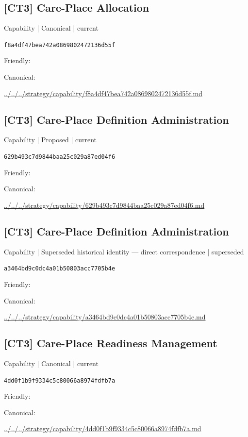 \documentclass[10pt,a4paper]{article}
\begin{document}
\subsection*{[CT3] Care-Place Allocation}
{\small Capability | Canonical | current}\par
\texttt{f8a4df47bea742a0869802472136d55f}\par
Friendly: \par
Canonical: \par
{\footnotesize\url{../../../strategy/capability/f8a4df47bea742a0869802472136d55f.md}}\par
\subsection*{[CT3] Care-Place Definition Administration}
{\small Capability | Proposed | current}\par
\texttt{629b493c7d9844baa25c029a87ed04f6}\par
Friendly: \par
Canonical: \par
{\footnotesize\url{../../../strategy/capability/629b493c7d9844baa25c029a87ed04f6.md}}\par
\subsection*{[CT3] Care-Place Definition Administration}
{\small Capability | Superseded historical identity — direct correspondence | superseded}\par
\texttt{a3464bd9c0dc4a01b50803acc7705b4e}\par
Friendly: \par
Canonical: \par
{\footnotesize\url{../../../strategy/capability/a3464bd9c0dc4a01b50803acc7705b4e.md}}\par
\subsection*{[CT3] Care-Place Readiness Management}
{\small Capability | Canonical | current}\par
\texttt{4dd0f1b9f9334c5c80066a8974fdfb7a}\par
Friendly: \par
Canonical: \par
{\footnotesize\url{../../../strategy/capability/4dd0f1b9f9334c5c80066a8974fdfb7a.md}}\par
\end{document}
